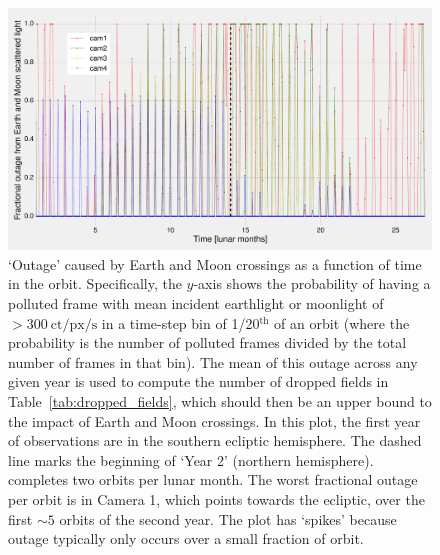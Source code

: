 \begin{figure}[!t]
	\centering
	\includegraphics[angle=90,width=1.05\textwidth]{figures/outage_earth_moon_primary.pdf}
	\caption{`Outage' caused by Earth and Moon crossings as a function of time in the orbit.
	Specifically, the $y$-axis shows the probability of having a polluted frame with mean incident earthlight or moonlight of $>300\ \mathrm{ct/px/s}$ in a time-step bin of 1/20$^\mathrm{th}$ of an orbit (where the probability is the number of polluted frames divided by the total number of frames in that bin).
	The mean of this outage across any given year is used to compute the number of dropped fields in Table~\protect\ref{tab:dropped_fields}, which should then be an upper bound to the impact of Earth and Moon crossings.
	In this plot, the first year of observations are in the southern ecliptic 
	hemisphere. The dashed line marks the beginning of `Year 2' (northern 
	hemisphere). 
	\tess completes two orbits per lunar month.
	The worst fractional outage per orbit is in Camera 1, which 
	points towards the ecliptic, over the first $\sim\!5$ orbits of the second 
	year.
	The plot has `spikes' because outage typically only occurs over a small 
	fraction of \tesss orbit.}
	\label{fig:earth_moon_primary}
\end{figure}
